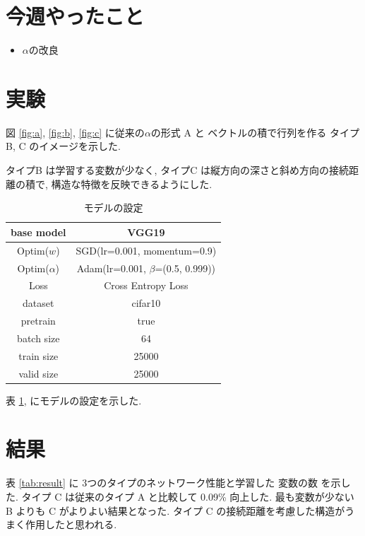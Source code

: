 \documentclass[twocolumn]{jarticle}     %
\begin{document}
\section{今週やったこと}
\begin{itemize}
  \item $\alpha$の改良
\end{itemize}


\section{実験}

図 \ref{fig:a}, \ref{fig:b}, \ref{fig:c} に従来の$\alpha$の形式 A と
ベクトルの積で行列を作る タイプB, C のイメージを示した.

タイプB は学習する変数が少なく,
タイプC は縦方向の深さと斜め方向の接続距離の積で, 構造な特徴を反映できるようにした.

\begin{table}[tb]
  \begin{center}
    \caption{モデルの設定}
    \begin{tabular}{|c|c|} \hline
      base model & VGG19 \\ \hline
      Optim($w$) & SGD(lr=0.001, momentum=0.9) \\ \hline
      Optim($\alpha$) & Adam(lr=0.001, $\beta$=(0.5, 0.999)) \\ \hline
      Loss & Cross Entropy Loss \\ \hline
      dataset & cifar10 \\ \hline
      pretrain & true \\ \hline
      batch size & 64 \\ \hline
      train size & 25000 \\ \hline
      valid size & 25000 \\ \hline
    \end{tabular}
    \label{tab:setting}
  \end{center}
\end{table}

表 \ref{tab:setting}, にモデルの設定を示した.



\section{結果}

表 \ref{tab:result} に 3つのタイプのネットワーク性能と学習した 変数の数 を示した.
タイプ C は従来のタイプ A と比較して 0.09\% 向上した.
最も変数が少ない B よりも C がよりよい結果となった.
タイプ C の接続距離を考慮した構造がうまく作用したと思われる.
\end{document}
